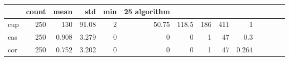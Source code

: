 \begin{tabular}{lrrrrrrrrr}
\toprule
 & count & mean & std & min & 25%
algorithm &  &  &  &  &  &  &  &  &  \\
\midrule
cup & 250 & 130 & 91.08 & 2 & 50.75 & 118.5 & 186 & 411 & 1 \\
cas & 250 & 0.908 & 3.279 & 0 & 0 & 0 & 1 & 47 & 0.3 \\
cor & 250 & 0.752 & 3.202 & 0 & 0 & 0 & 1 & 47 & 0.264 \\
\bottomrule
\end{tabular}

